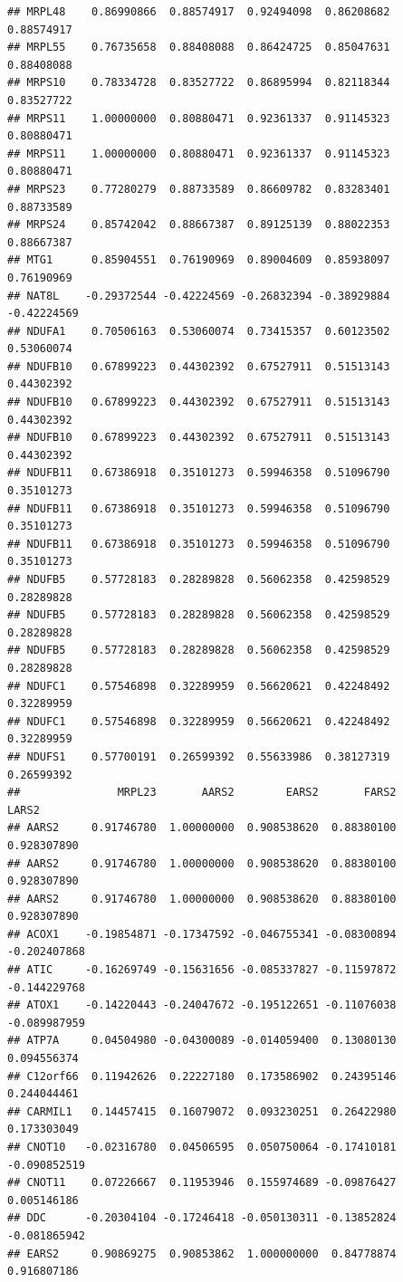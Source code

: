 \documentclass[
]{article}
\begin{document}
\begin{verbatim}
## MRPL48    0.86990866  0.88574917  0.92494098  0.86208682  0.88574917
## MRPL55    0.76735658  0.88408088  0.86424725  0.85047631  0.88408088
## MRPS10    0.78334728  0.83527722  0.86895994  0.82118344  0.83527722
## MRPS11    1.00000000  0.80880471  0.92361337  0.91145323  0.80880471
## MRPS11    1.00000000  0.80880471  0.92361337  0.91145323  0.80880471
## MRPS23    0.77280279  0.88733589  0.86609782  0.83283401  0.88733589
## MRPS24    0.85742042  0.88667387  0.89125139  0.88022353  0.88667387
## MTG1      0.85904551  0.76190969  0.89004609  0.85938097  0.76190969
## NAT8L    -0.29372544 -0.42224569 -0.26832394 -0.38929884 -0.42224569
## NDUFA1    0.70506163  0.53060074  0.73415357  0.60123502  0.53060074
## NDUFB10   0.67899223  0.44302392  0.67527911  0.51513143  0.44302392
## NDUFB10   0.67899223  0.44302392  0.67527911  0.51513143  0.44302392
## NDUFB10   0.67899223  0.44302392  0.67527911  0.51513143  0.44302392
## NDUFB11   0.67386918  0.35101273  0.59946358  0.51096790  0.35101273
## NDUFB11   0.67386918  0.35101273  0.59946358  0.51096790  0.35101273
## NDUFB11   0.67386918  0.35101273  0.59946358  0.51096790  0.35101273
## NDUFB5    0.57728183  0.28289828  0.56062358  0.42598529  0.28289828
## NDUFB5    0.57728183  0.28289828  0.56062358  0.42598529  0.28289828
## NDUFB5    0.57728183  0.28289828  0.56062358  0.42598529  0.28289828
## NDUFC1    0.57546898  0.32289959  0.56620621  0.42248492  0.32289959
## NDUFC1    0.57546898  0.32289959  0.56620621  0.42248492  0.32289959
## NDUFS1    0.57700191  0.26599392  0.55633986  0.38127319  0.26599392
##               MRPL23       AARS2        EARS2       FARS2        LARS2
## AARS2     0.91746780  1.00000000  0.908538620  0.88380100  0.928307890
## AARS2     0.91746780  1.00000000  0.908538620  0.88380100  0.928307890
## AARS2     0.91746780  1.00000000  0.908538620  0.88380100  0.928307890
## ACOX1    -0.19854871 -0.17347592 -0.046755341 -0.08300894 -0.202407868
## ATIC     -0.16269749 -0.15631656 -0.085337827 -0.11597872 -0.144229768
## ATOX1    -0.14220443 -0.24047672 -0.195122651 -0.11076038 -0.089987959
## ATP7A     0.04504980 -0.04300089 -0.014059400  0.13080130  0.094556374
## C12orf66  0.11942626  0.22227180  0.173586902  0.24395146  0.244044461
## CARMIL1   0.14457415  0.16079072  0.093230251  0.26422980  0.173303049
## CNOT10   -0.02316780  0.04506595  0.050750064 -0.17410181 -0.090852519
## CNOT11    0.07226667  0.11953946  0.155974689 -0.09876427  0.005146186
## DDC      -0.20304104 -0.17246418 -0.050130311 -0.13852824 -0.081865942
## EARS2     0.90869275  0.90853862  1.000000000  0.84778874  0.916807186

\end{verbatim}
\end{document}
